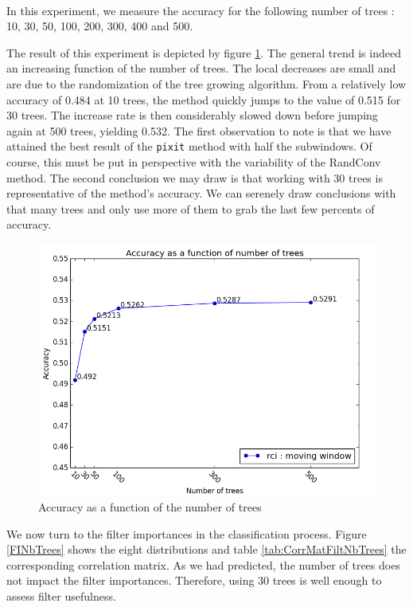 \documentclass[a4paper]{report}
\begin{document}
		\paragraph{}
		In this experiment, we measure the accuracy for the following number of trees : 10, 30, 50, 100, 200, 300, 400 and 500. 
		
		The result of this experiment is depicted by figure \ref{fig:accFnbTrees}. The general trend is indeed an increasing function of the number of trees. The local decreases are small and are due to the randomization of the tree growing algorithm. From a relatively low accuracy of 0.484 at 10 trees, the method quickly jumps to the value of 0.515 for 30 trees. The increase rate is then considerably slowed down before jumping again at 500 trees, yielding 0.532. The first observation to note is that we have attained the best result of the \texttt{pixit} method with half the subwindows. Of course, this must be put in perspective with the variability of the RandConv method. The second conclusion we may draw is that working with 30 trees is representative of the method's accuracy. We can serenely draw conclusions with that many trees and only use more of them to grab the last few percents of accuracy.
		\begin{figure}
			\centering
				\includegraphics[width=1.0\textwidth]{images/accFnbTrees.png}
			\caption{\label{fig:accFnbTrees}Accuracy as a function of the number of trees}
		\end{figure}
		
		
		\par
		We now turn to the filter importances in the classification process. Figure \ref{FINbTrees} shows the eight distributions and table \ref{tab:CorrMatFiltNbTrees} the corresponding correlation matrix. As we had predicted, the number of trees does not impact the filter importances. Therefore, using 30 trees is well enough to assess filter usefulness.
		
\end{document}
